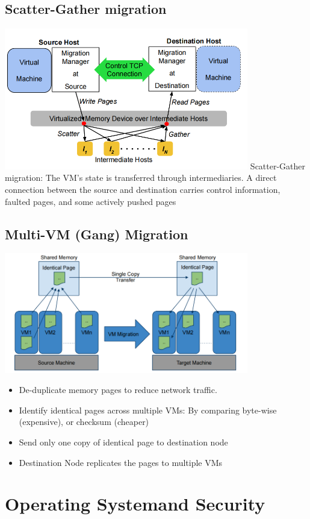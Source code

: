 \documentclass[12pt]{article}
\begin{document}
\subsection{Scatter-Gather migration}
\includegraphics[width=0.8\textwidth]{Scatter-GatherMigration.png}
Scatter-Gather migration: The VM's state is transferred through intermediaries. A direct connection between the source and destination carries control information, faulted pages, and some actively pushed pages
\subsection{Multi-VM (Gang) Migration}
\includegraphics[width=0.8\textwidth]{Multi-VMMigration.png}
\begin{itemize}
    \item De-duplicate memory pages to reduce network traffic.
    \item Identify identical pages across multiple VMs: By comparing byte-wise (expensive), or checksum (cheaper)
    \item Send only one copy of identical page to destination node
    \item Destination Node replicates the pages to multiple VMs
\end{itemize}

\section{Operating Systemand Security}
\end{document}
